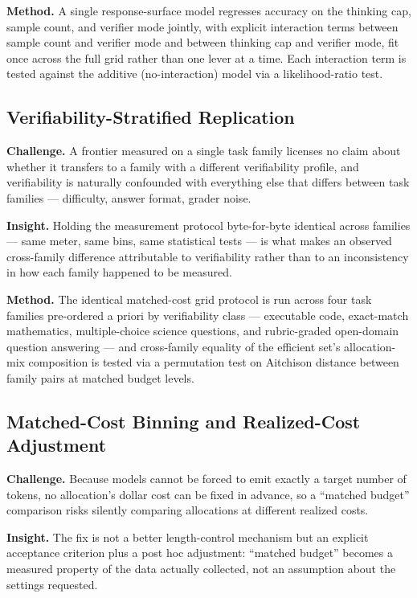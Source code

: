 \documentclass[11pt]{article}
\begin{document}
\textbf{Method.} A single response-surface model regresses accuracy on the thinking cap, sample count, and verifier mode jointly, with explicit interaction terms between sample count and verifier mode and between thinking cap and verifier mode, fit once across the full grid rather than one lever at a time. Each interaction term is tested against the additive (no-interaction) model via a likelihood-ratio test.

\subsection{Verifiability-Stratified Replication}
\textbf{Challenge.} A frontier measured on a single task family licenses no claim about whether it transfers to a family with a different verifiability profile, and verifiability is naturally confounded with everything else that differs between task families --- difficulty, answer format, grader noise.

\textbf{Insight.} Holding the measurement protocol byte-for-byte identical across families --- same meter, same bins, same statistical tests --- is what makes an observed cross-family difference attributable to verifiability rather than to an inconsistency in how each family happened to be measured.

\textbf{Method.} The identical matched-cost grid protocol is run across four task families pre-ordered a priori by verifiability class --- executable code, exact-match mathematics, multiple-choice science questions, and rubric-graded open-domain question answering --- and cross-family equality of the efficient set's allocation-mix composition is tested via a permutation test on Aitchison distance between family pairs at matched budget levels.

\subsection{Matched-Cost Binning and Realized-Cost Adjustment}
\textbf{Challenge.} Because models cannot be forced to emit exactly a target number of tokens, no allocation's dollar cost can be fixed in advance, so a ``matched budget'' comparison risks silently comparing allocations at different realized costs.

\textbf{Insight.} The fix is not a better length-control mechanism but an explicit acceptance criterion plus a post hoc adjustment: ``matched budget'' becomes a measured property of the data actually collected, not an assumption about the settings requested.
\end{document}
